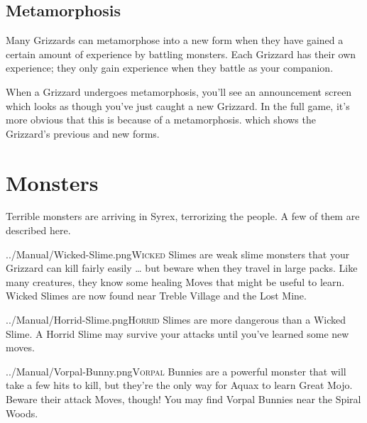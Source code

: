 \documentclass[10pt,twocolumn,openany,article]{memoir}
\begin{document}
\section{Metamorphosis}

Many Grizzards  can metamorphose into a  new form when they  have gained
a certain amount  of experience by battling monsters.  Each Grizzard has
their  own experience;  they only  gain experience  when they  battle as
your companion.

When  a Grizzard  undergoes  metamorphosis, you'll  see an  announcement
screen  \ifdefined\DEMO  which  looks   as  though  you've  just  caught
a new Grizzard. In the full game, it's more obvious that this is because
of  a  metamorphosis. \else  which  shows  the Grizzard's  previous  and
new forms. \fi

\columnbreak
\chapter{Monsters}

Terrible monsters are  arriving in Syrex, terrorizing the  people. A few
of them are described here.

\vspace{14pt}

\lettrine[image=true,                lines=5,               findent=3pt,
nindent=3pt]{../Manual/Wicked-Slime.png}{Wicked}  Slimes are  weak slime
monsters that  your Grizzard can  kill fairly  easily … but  beware when
they travel in large packs. Like  many creatures, they know some healing
Moves that  might be useful to  learn. Wicked Slimes are  now found near
Treble Village and the Lost Mine.

\vspace{14pt}

\lettrine[image=true,                lines=5,               findent=3pt,
nindent=3pt]{../Manual/Horrid-Slime.png}{Horrid}    Slimes   are    more
dangerous than a  Wicked Slime. A Horrid Slime may  survive your attacks
until you've learned some new moves.

\vspace{14pt}

\lettrine[image=true,                lines=5,               findent=3pt,
nindent=3pt]{../Manual/Vorpal-Bunny.png}{Vorpal} Bunnies  are a powerful
monster that will take a few hits  to kill, but they're the only way for
Aquax to  learn Great Mojo. Beware  their attack Moves, though!  You may
find Vorpal Bunnies near the Spiral Woods.
\end{document}
